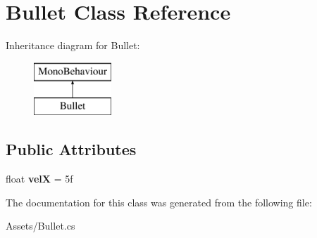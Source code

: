 \hypertarget{class_bullet}{}\section{Bullet Class Reference}
\label{class_bullet}
Inheritance diagram for Bullet\+:\begin{figure}[H]
\begin{center}
\leavevmode
\includegraphics[height=2.000000cm]{class_bullet}
\end{center}
\end{figure}
\subsection*{Public Attributes}
\begin{DoxyCompactItemize}
\item 
\mbox{\label{class_bullet_a0b778be60271e8555331383e78a7aa0f}} 
float {\bfseries velX} = 5f
\end{DoxyCompactItemize}


The documentation for this class was generated from the following file\+:\begin{DoxyCompactItemize}
\item 
Assets/Bullet.\+cs\end{DoxyCompactItemize}
